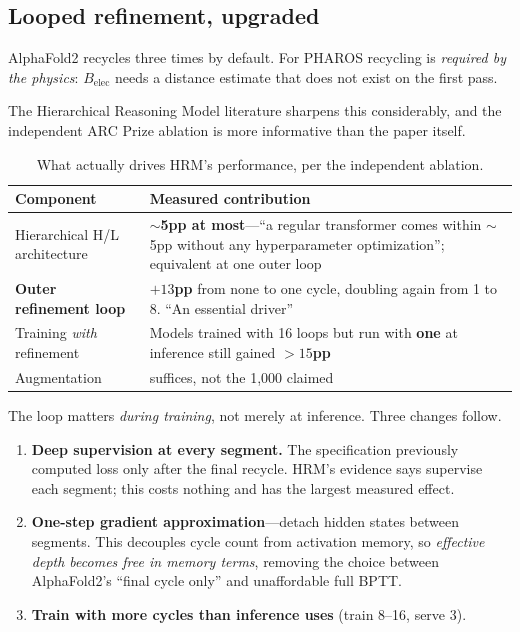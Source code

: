 \documentclass[11pt,a4paper]{article}
\begin{document}
\subsection{Looped refinement, upgraded}
\label{sec:loop}

AlphaFold2 recycles three times by default. For PHAROS recycling is
\emph{required by the physics}: $B_{\mathrm{elec}}$ needs a distance estimate
that does not exist on the first pass.

The Hierarchical Reasoning Model literature sharpens this considerably, and the
independent ARC Prize ablation is more informative than the paper itself.

\begin{table}[h]
\centering
\caption{What actually drives HRM's performance, per the independent ablation.}
\small
\begin{tabular}{@{}>{\raggedright\arraybackslash}p{5.0cm}>{\raggedright\arraybackslash}p{9.4cm}@{}}
\toprule
\textbf{Component} & \textbf{Measured contribution} \\
\midrule
Hierarchical H/L architecture & \textbf{$\sim$5pp at most}---``a regular transformer comes within $\sim$5pp without any hyperparameter optimization''; equivalent at one outer loop \\
\textbf{Outer refinement loop} & \textbf{$+13$pp} from none to one cycle, doubling again from 1 to 8. ``An essential driver'' \\
Training \emph{with} refinement & Models trained with 16 loops but run with \textbf{one} at inference still gained \textbf{$>15$pp} \\
Augmentation & 300 suffices, not the 1{,}000 claimed \\
\bottomrule
\end{tabular}
\end{table}

\noindent The loop matters \emph{during training}, not merely at inference. Three
changes follow.

\begin{enumerate}[leftmargin=1.4em,itemsep=0.2em]
\item \textbf{Deep supervision at every segment.} The specification previously
computed loss only after the final recycle. HRM's evidence says supervise each
segment; this costs nothing and has the largest measured effect.
\item \textbf{One-step gradient approximation}---detach hidden states between
segments. This decouples cycle count from activation memory, so \emph{effective
depth becomes free in memory terms}, removing the choice between AlphaFold2's
``final cycle only'' and unaffordable full BPTT.
\item \textbf{Train with more cycles than inference uses} (train 8--16, serve 3).
\end{enumerate}
\end{document}
